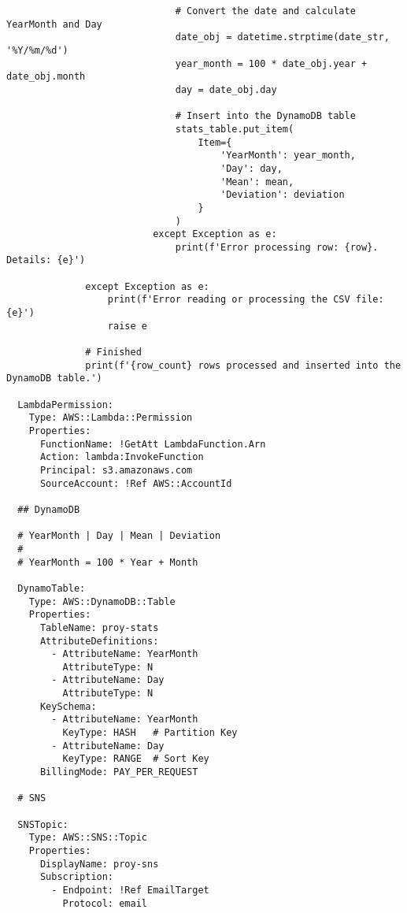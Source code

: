\begin{verbatim}
                              # Convert the date and calculate YearMonth and Day
                              date_obj = datetime.strptime(date_str, '%Y/%m/%d')
                              year_month = 100 * date_obj.year + date_obj.month
                              day = date_obj.day

                              # Insert into the DynamoDB table
                              stats_table.put_item(
                                  Item={
                                      'YearMonth': year_month,
                                      'Day': day,
                                      'Mean': mean,
                                      'Deviation': deviation
                                  }
                              )
                          except Exception as e:
                              print(f'Error processing row: {row}. Details: {e}')

              except Exception as e:
                  print(f'Error reading or processing the CSV file: {e}')
                  raise e

              # Finished
              print(f'{row_count} rows processed and inserted into the DynamoDB table.')

  LambdaPermission:
    Type: AWS::Lambda::Permission
    Properties:
      FunctionName: !GetAtt LambdaFunction.Arn
      Action: lambda:InvokeFunction
      Principal: s3.amazonaws.com
      SourceAccount: !Ref AWS::AccountId

  ## DynamoDB

  # YearMonth | Day | Mean | Deviation
  #
  # YearMonth = 100 * Year + Month

  DynamoTable:
    Type: AWS::DynamoDB::Table
    Properties:
      TableName: proy-stats
      AttributeDefinitions:
        - AttributeName: YearMonth
          AttributeType: N
        - AttributeName: Day
          AttributeType: N
      KeySchema:
        - AttributeName: YearMonth
          KeyType: HASH   # Partition Key
        - AttributeName: Day
          KeyType: RANGE  # Sort Key
      BillingMode: PAY_PER_REQUEST

  # SNS

  SNSTopic:
    Type: AWS::SNS::Topic
    Properties:
      DisplayName: proy-sns
      Subscription:
        - Endpoint: !Ref EmailTarget
          Protocol: email
\end{verbatim}
